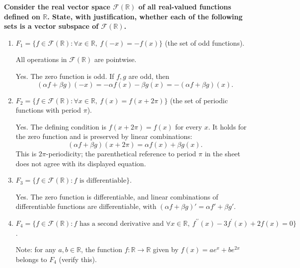 \providecommand{\rank}{\operatorname{r}}
\providecommand{\RR}{\mathbb R}
\providecommand{\CC}{\mathbb C}
\providecommand{\KK}{\mathbb K}

\setcounter{enumi}{64}
\item {\bfseries\boldmath
Consider the real vector space $\mathcal F(\RR)$ of all real-valued functions defined on $\RR$. State, with justification, whether each of the following sets is a vector subspace of $\mathcal F(\RR)$.
}

\begin{enumerate}[label=\alph*)]

\item $F_1=\{f\in\mathcal F(\RR):\forall x\in\RR,\ f(-x)=-f(x)\}$ (the set of odd functions).

\begin{answer}
All operations in $\mathcal F(\RR)$ are pointwise.

Yes. The zero function is odd. If $f,g$ are odd, then
\[
 (\alpha f+\beta g)(-x)
 =-\alpha f(x)-\beta g(x)=-(\alpha f+\beta g)(x).
\]
\end{answer}

\item $F_2=\{f\in\mathcal F(\RR):\forall x\in\RR,\ f(x)=f(x+2\pi)\}$ (the set of periodic functions with period $\pi$).

\begin{answer}
Yes. The defining condition is $f(x+2\pi)=f(x)$ for every $x$.
It holds for the zero function and is preserved by linear combinations:
\[
 (\alpha f+\beta g)(x+2\pi)=\alpha f(x)+\beta g(x).
\]
This is $2\pi$-periodicity; the parenthetical reference to period $\pi$ in
the sheet does not agree with its displayed equation.
\end{answer}

\item $F_3=\{f\in\mathcal F(\RR):f\text{ is differentiable}\}$.

\begin{answer}
Yes. The zero function is differentiable, and linear combinations of
differentiable functions are differentiable, with
$(\alpha f+\beta g)'=\alpha f'+\beta g'$.
\end{answer}

\item $F_4=\{f\in\mathcal F(\RR):f\text{ has a second derivative and }\forall x\in\RR,\ f^{\prime\prime}(x)-3f^{\prime}(x)+2f(x)=0\}$.

Note: for any $a,b\in\RR$, the function $f:\RR\to\RR$ given by $f(x)=ae^x+be^{2x}$ belongs to $F_4$ (verify this).


\end{enumerate}
